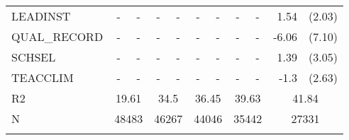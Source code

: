 \documentclass[10pt]{article}
\begin{document}
\begin{table}[htbp]
\begin{tabular}{lrlrlrlrlrl}
     	LEADINST & \multicolumn{1}{c}{-} & \multicolumn{1}{c}{-} & \multicolumn{1}{c}{-} & \multicolumn{1}{c}{-} & \multicolumn{1}{c}{-} & \multicolumn{1}{c}{-} & \multicolumn{1}{c}{-} & \multicolumn{1}{c}{-} & 1.54  & (2.03) \\[0.2em]
     	QUAL\_RECORD & \multicolumn{1}{c}{-} & \multicolumn{1}{c}{-} & \multicolumn{1}{c}{-} & \multicolumn{1}{c}{-} & \multicolumn{1}{c}{-} & \multicolumn{1}{c}{-} & \multicolumn{1}{c}{-} & \multicolumn{1}{c}{-} & -6.06 & (7.10) \\[0.2em]
     	SCHSEL & \multicolumn{1}{c}{-} & \multicolumn{1}{c}{-} & \multicolumn{1}{c}{-} & \multicolumn{1}{c}{-} & \multicolumn{1}{c}{-} & \multicolumn{1}{c}{-} & \multicolumn{1}{c}{-} & \multicolumn{1}{c}{-} & 1.39  & (3.05) \\[0.2em]
     	TEACCLIM & \multicolumn{1}{c}{-} & \multicolumn{1}{c}{-} & \multicolumn{1}{c}{-} & \multicolumn{1}{c}{-} & \multicolumn{1}{c}{-} & \multicolumn{1}{c}{-} & \multicolumn{1}{c}{-} & \multicolumn{1}{c}{-} & -1.3  & (2.63) \\[0.2em]
     	R2    & \multicolumn{2}{c}{19.61} & \multicolumn{2}{c}{34.5} & \multicolumn{2}{c}{36.45} & \multicolumn{2}{c}{39.63} & \multicolumn{2}{c}{41.84} \\[0.2em]
     	N     & \multicolumn{2}{c}{48483} & \multicolumn{2}{c}{46267} & \multicolumn{2}{c}{44046} & \multicolumn{2}{c}{35442} & \multicolumn{2}{c}{27331} \\[0.2em]
     	\bottomrule
     	        \\
     	        
     	    \end{tabular}%
     	    \label{tab:addlabel}%
     	\end{table}%
     
\end{document}
